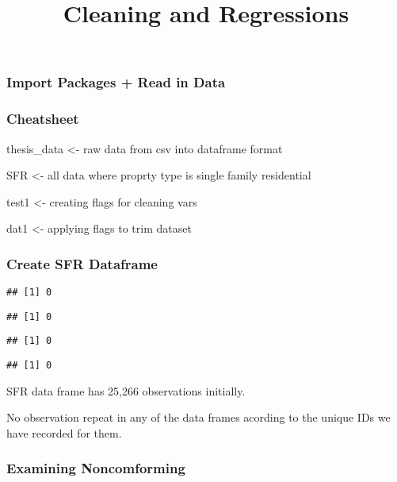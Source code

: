 \documentclass[]{article}
\title{Cleaning and Regressions}
\author{}
\date{}
\begin{document}
\maketitle

\hypertarget{import-packages-read-in-data}{%
\subsubsection{Import Packages + Read in
Data}\label{import-packages-read-in-data}}

\hypertarget{cheatsheet}{%
\subsubsection{Cheatsheet}\label{cheatsheet}}

thesis\_data \textless{}- raw data from csv into dataframe format

SFR \textless{}- all data where proprty type is single family
residential

test1 \textless{}- creating flags for cleaning vars

dat1 \textless{}- applying flags to trim dataset

\hypertarget{create-sfr-dataframe}{%
\subsubsection{Create SFR Dataframe}\label{create-sfr-dataframe}}

\begin{verbatim}
## [1] 0
\end{verbatim}

\begin{verbatim}
## [1] 0
\end{verbatim}

\begin{verbatim}
## [1] 0
\end{verbatim}

\begin{verbatim}
## [1] 0
\end{verbatim}

SFR data frame has 25,266 observations initially.

No observation repeat in any of the data frames acording to the unique
IDs we have recorded for them.

\hypertarget{examining-noncomforming}{%
\subsubsection{Examining Noncomforming}\label{examining-noncomforming}}
\end{document}
